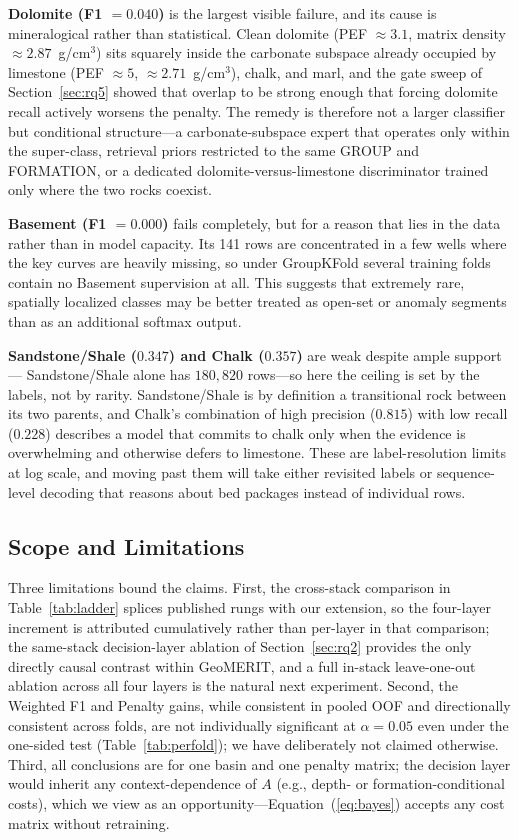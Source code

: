 \documentclass[bdcc,article,submit,pdftex,moreauthors]{Definitions/mdpi}
\begin{document}
\textbf{Dolomite (F1 $=0.040$)} is the largest visible failure, and its cause is mineralogical
rather than statistical. Clean dolomite (PEF $\approx 3.1$, matrix density
$\approx 2.87$~g/cm$^3$) sits squarely inside the carbonate subspace already occupied by
limestone (PEF $\approx 5$, $\approx 2.71$~g/cm$^3$), chalk, and marl, and the gate sweep of
Section~\ref{sec:rq5} showed that overlap to be strong enough that forcing dolomite recall
actively worsens the penalty. The remedy is therefore not a larger classifier but conditional
structure---a carbonate-subspace expert that operates only within the super-class, retrieval
priors restricted to the same GROUP and FORMATION, or a dedicated dolomite-versus-limestone
discriminator trained only where the two rocks coexist.

\textbf{Basement (F1 $=0.000$)} fails completely, but for a reason that lies in the data rather
than in model capacity. Its 141 rows are concentrated in a few wells where the key curves are
heavily missing, so under GroupKFold several training folds contain no Basement supervision at
all. This suggests that extremely rare, spatially localized classes may be better treated as
open-set or anomaly segments than as an additional softmax output.

\textbf{Sandstone/Shale ($0.347$) and Chalk ($0.357$)} are weak despite ample support---
Sandstone/Shale alone has $180{,}820$ rows---so here the ceiling is set by the labels, not by
rarity. Sandstone/Shale is by definition a transitional rock between its two parents, and
Chalk's combination of high precision ($0.815$) with low recall ($0.228$) describes a model
that commits to chalk only when the evidence is overwhelming and otherwise defers to limestone.
These are label-resolution limits at log scale, and moving past them will take either revisited
labels or sequence-level decoding that reasons about bed packages instead of individual rows.

\subsection{Scope and Limitations}
\label{sec:limits}
Three limitations bound the claims. First, the cross-stack comparison in
Table~\ref{tab:ladder} splices published rungs with our extension, so the four-layer
increment is attributed cumulatively rather than per-layer in that comparison; the
same-stack decision-layer ablation of Section~\ref{sec:rq2} provides the only directly
causal contrast within GeoMERIT, and a full in-stack leave-one-out ablation across all four
layers is the natural next experiment. Second, the Weighted F1 and Penalty gains, while
consistent in pooled OOF and directionally consistent across folds, are not individually
significant at $\alpha=0.05$ even under the one-sided test (Table~\ref{tab:perfold}); we
have deliberately not claimed otherwise. Third, all conclusions are for one basin and one
penalty matrix; the decision layer would inherit any context-dependence of $A$ (e.g., depth-
or formation-conditional costs), which we view as an opportunity---Equation~(\ref{eq:bayes})
accepts any cost matrix without retraining.
\end{document}
